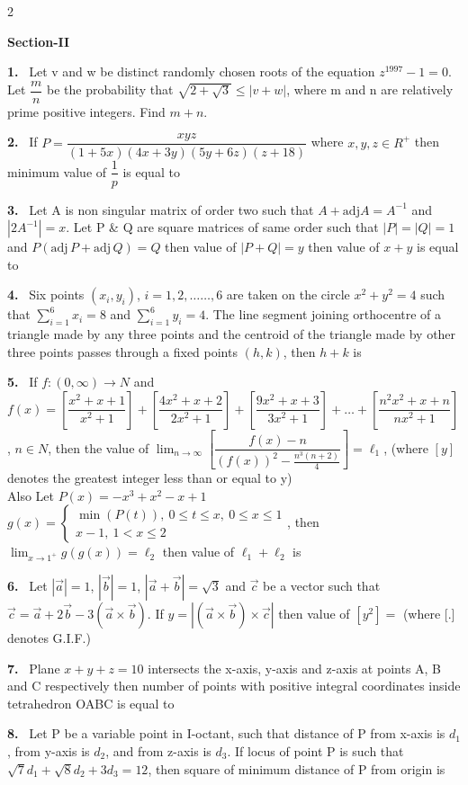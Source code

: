 \documentclass[10pt]{extarticle}
\newcommand{\sect}[1]{\par\smallskip\noindent\textbf{#1}\par}
\newcommand{\qn}[1]{\par\smallskip\noindent\textbf{#1.}~}
\begin{document}
\begin{multicols}{2}
\sect{Section-II}

\qn{1} Let v and w be distinct randomly chosen roots of the equation $z^{1997}-1=0$. Let $\dfrac mn$ be the probability that $\sqrt{2+\sqrt3}\leqslant|v+w|$, where m and n are relatively prime positive integers. Find $m+n$.

\qn{2} If $P=\dfrac{xyz}{(1+5x)(4x+3y)(5y+6z)(z+18)}$ where $x,y,z\in R^+$ then minimum value of $\dfrac1p$ is equal to

\qn{3} Let A is non singular matrix of order two such that $A+\text{adj}A=A^{-1}$ and $|2A^{-1}|=x$. Let P \& Q are square matrices of same order such that $|P|=|Q|=1$ and $P(\text{adj}\,P+\text{adj}\,Q)=Q$ then value of $|P+Q|=y$ then value of $x+y$ is equal to

\qn{4} Six points $(x_i,y_i)$, $i=1,2,\dots\dots,6$ are taken on the circle $x^2+y^2=4$ such that $\displaystyle\sum_{i=1}^{6}x_i=8$ and $\displaystyle\sum_{i=1}^{6}y_i=4$. The line segment joining orthocentre of a triangle made by any three points and the centroid of the triangle made by other three points passes through a fixed points $(h,k)$, then $h+k$ is

\qn{5} If $f:(0,\infty)\to N$ and $f(x)=\left[\dfrac{x^2+x+1}{x^2+1}\right]+\left[\dfrac{4x^2+x+2}{2x^2+1}\right]+\left[\dfrac{9x^2+x+3}{3x^2+1}\right]+\dots+\left[\dfrac{n^2x^2+x+n}{nx^2+1}\right]$, $n\in N$, then the value of $\displaystyle\lim_{n\to\infty}\left[\dfrac{f(x)-n}{(f(x))^2-\frac{n^3(n+2)}4}\right]=\ell_1$, (where $[y]$ denotes the greatest integer less than or equal to y)\\
Also Let $P(x)=-x^3+x^2-x+1$\\
$g(x)=\begin{cases}\min(P(t)),\ 0\leqslant t\leqslant x,\ 0\leqslant x\leqslant1\\ x-1,\ 1<x\leqslant2\end{cases}$, then $\displaystyle\lim_{x\to1^+}g(g(x))=\ell_2$ then value of $\ell_1+\ell_2$ is

\qn{6} Let $|\vec a|=1$, $|\vec b|=1$, $|\vec a+\vec b|=\sqrt3$ and $\vec c$ be a vector such that $\vec c=\vec a+2\vec b-3(\vec a\times\vec b)$. If $y=|(\vec a\times\vec b)\times\vec c|$ then value of $[y^2]=$ \underline{\hspace{1cm}} (where [.] denotes G.I.F.)

\qn{7} Plane $x+y+z=10$ intersects the x-axis, y-axis and z-axis at points A, B and C respectively then number of points with positive integral coordinates inside tetrahedron OABC is equal to \underline{\hspace{1cm}}

\qn{8} Let P be a variable point in I-octant, such that distance of P from x-axis is $d_1$, from y-axis is $d_2$, and from z-axis is $d_3$. If locus of point P is such that $\sqrt7d_1+\sqrt8d_2+3d_3=12$, then square of minimum distance of P from origin is

\end{multicols}
\end{document}
